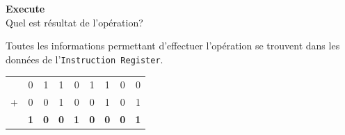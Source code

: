 \begin{Exercice}[10 minutes] \textbf{Execute}\\
    Quel est résultat de l'opération?
    \begin{conseil}
        Toutes les informations permettant d'effectuer l'opération se trouvent dans les données de l'\lstinline{Instruction Register}.
    \end{conseil}
    \begin{solution}
        \begin{tabular}{ccccccccc}
            & 0 & 1 & 1 & 0 & 1 & 1 & 0 & 0 \\
          + & 0 & 0 & 1 & 0 & 0 & 1 & 0 & 1 \\
          \hline
            & \textbf{1} & \textbf{0} & \textbf{0} & \textbf{1} & \textbf{0} & \textbf{0} & \textbf{0} & \textbf{1} \\
          \end{tabular}
    \end{solution}
\end{Exercice}



